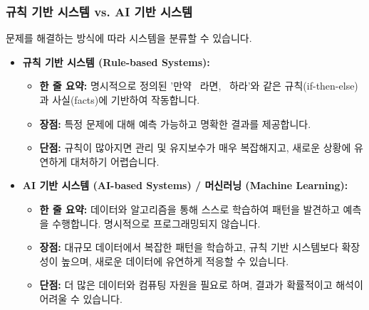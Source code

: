 \documentclass[11pt,a4paper]{article}
\begin{document}
\subsubsection*{규칙 기반 시스템 vs. AI 기반 시스템}
문제를 해결하는 방식에 따라 시스템을 분류할 수 있습니다.
\begin{itemize}
    \item \textbf{규칙 기반 시스템 (Rule-based Systems):}
    \begin{itemize}
        \item \textbf{한 줄 요약:} 명시적으로 정의된 '만약 ~라면, ~하라'와 같은 규칙(if-then-else)과 사실(facts)에 기반하여 작동합니다.
        \item \textbf{장점:} 특정 문제에 대해 예측 가능하고 명확한 결과를 제공합니다.
        \item \textbf{단점:} 규칙이 많아지면 관리 및 유지보수가 매우 복잡해지고, 새로운 상황에 유연하게 대처하기 어렵습니다.
    \end{itemize}
    \item \textbf{AI 기반 시스템 (AI-based Systems) / 머신러닝 (Machine Learning):}
    \begin{itemize}
        \item \textbf{한 줄 요약:} 데이터와 알고리즘을 통해 스스로 학습하여 패턴을 발견하고 예측을 수행합니다. 명시적으로 프로그래밍되지 않습니다.
        \item \textbf{장점:} 대규모 데이터에서 복잡한 패턴을 학습하고, 규칙 기반 시스템보다 확장성이 높으며, 새로운 데이터에 유연하게 적응할 수 있습니다.
        \item \textbf{단점:} 더 많은 데이터와 컴퓨팅 자원을 필요로 하며, 결과가 확률적이고 해석이 어려울 수 있습니다.
    \end{itemize}
\end{itemize}
\end{document}
